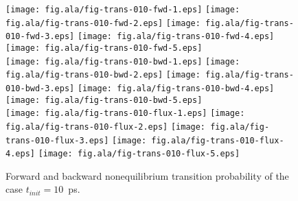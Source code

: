 \documentclass[aip,jcp,a4paper,preprint,onecolumn]{revtex4-1}
\begin{document}
\begin{figure}
  \centering
  \texttt{[image: fig.ala/fig-trans-010-fwd-1.eps]}
  \texttt{[image: fig.ala/fig-trans-010-fwd-2.eps]}
  \texttt{[image: fig.ala/fig-trans-010-fwd-3.eps]}
  \texttt{[image: fig.ala/fig-trans-010-fwd-4.eps]}
  \texttt{[image: fig.ala/fig-trans-010-fwd-5.eps]}\\
  \texttt{[image: fig.ala/fig-trans-010-bwd-1.eps]}
  \texttt{[image: fig.ala/fig-trans-010-bwd-2.eps]}
  \texttt{[image: fig.ala/fig-trans-010-bwd-3.eps]}
  \texttt{[image: fig.ala/fig-trans-010-bwd-4.eps]}
  \texttt{[image: fig.ala/fig-trans-010-bwd-5.eps]}\\
  \texttt{[image: fig.ala/fig-trans-010-flux-1.eps]}
  \texttt{[image: fig.ala/fig-trans-010-flux-2.eps]}
  \texttt{[image: fig.ala/fig-trans-010-flux-3.eps]}
  \texttt{[image: fig.ala/fig-trans-010-flux-4.eps]}
  \texttt{[image: fig.ala/fig-trans-010-flux-5.eps]}
  \caption{Forward and backward nonequilibrium transition probability of the case $t_{init} = 10$~ps.}
  \label{fig:tmp6}
\end{figure}
\end{document}
